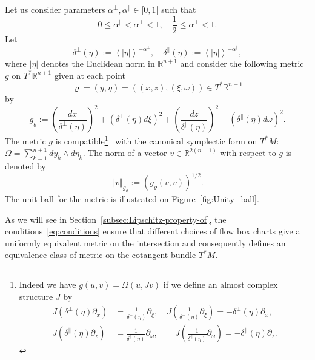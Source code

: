 \documentclass[AHL,Unicode,longabstracts,published]{cedram}
\newcommand{\bbR}{\mathbb{R}}
\newcommand{\bbR}{\mathbb{R}}
\begin{document}
Let us consider parameters $\alpha^{\perp},\alpha^{\parallel}\in[0,1[$ such that
\begin{equation}\label{eq:conditions}
0\leq\alpha^{\parallel}<\alpha^{\perp}<1,\quad\frac{1}{2}\leq\alpha^{\perp}<1.
\end{equation}
Let
\begin{equation}\label{eq:def_delta}
\delta^{\perp}\left(\eta\right):=\left\langle \left|\eta\right|\right\rangle ^{-\alpha^{\perp}},\quad\delta^{\parallel}\left(\eta\right):=\left\langle \left|\eta\right|\right\rangle ^{-\alpha^{\parallel}},
\end{equation}
where $|\eta|$ denotes the Euclidean norm in $\bbR^{n+1}$ and consider the following metric $g$ on $T^{*}\bbR^{n+1}$ given at each point
\[
\varrho=\left(y,\eta\right)=\left(\left(x,z\right),\left(\xi,\omega\right)\right)\in T^{*}\bbR^{n+1}
\]
by
\begin{equation}\label{eq:metric_g_in_coordinates}
g_{\varrho}:=\left(\frac{dx}{\delta^{\perp}\left(\eta\right)}\right)^{2}+\left(\delta^{\perp}\left(\eta\right)d\xi\right)^{2}+\left(\frac{dz}{\delta^{\parallel}\left(\eta\right)}\right)^{2}+\left(\delta^{\parallel}\left(\eta\right)d\omega\right)^{2}.
\end{equation}
The metric $g$ is compatible\footnote{Indeed we have $g(u,v)=\Omega(u,Jv)$ if we define an almost complex structure $J$ by
\begin{align*}
J\left(\delta^{\perp}\left(\eta\right)\partial_{x}\right) & =\frac{1}{\delta^{\perp}\left(\eta\right)}\partial_{\xi},\quad J\left(\frac{1}{\delta^{\perp}\left(\eta\right)}\partial_{\xi}\right)=-\delta^{\perp}\left(\eta\right)\partial_{x},\\
J\left(\delta^{\parallel}\left(\eta\right)\partial_{z}\right) & =\frac{1}{\delta^{\parallel}\left(\eta\right)}\partial_{\omega},\qquad J\left(\frac{1}{\delta^{\parallel}\left(\eta\right)}\partial_{\omega}\right)=-\delta^{\parallel}\left(\eta\right)\partial_{z}.
\end{align*}
}~\cite{da_silva_01,mac_duff_98} with the canonical symplectic form on $T^{*}M$: $\Omega=\sum_{k=1}^{n+1}dy_{k}\wedge d\eta_{k}$. The norm of a vector $v\in\bbR^{2(n+1)}$ with respect to $g$ is denoted by
\begin{equation}\label{eq:def_norm_g}
\left\Vert v\right\Vert _{g_{\varrho}}:=\left(g_{\varrho}\left(v,v\right)\right)^{1/2}.
\end{equation}
The unit ball for the metric is illustrated on Figure~\ref{fig:Unity_ball}.

As we will see in Section~\ref{subsec:Lipschitz-property-of}, the conditions~\eqref{eq:conditions} ensure that different choices of flow box charts give a uniformly equivalent metric on the intersection and consequently defines an equivalence class of metric on the cotangent bundle $T^{*}M$.
\end{document}
